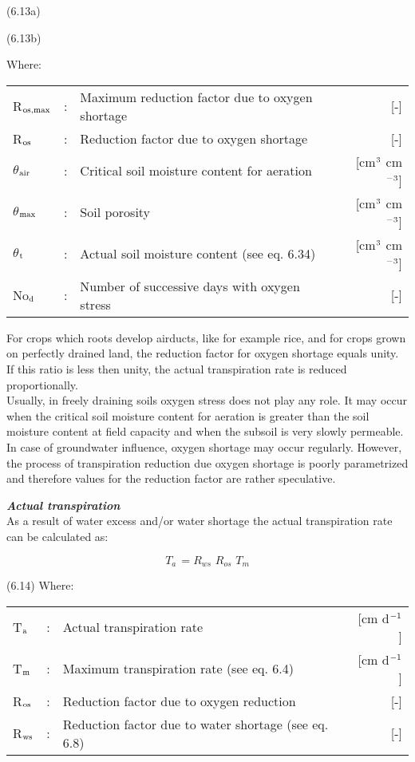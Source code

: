  
\strut\hfill (6.13a)


\strut\hfill (6.13b)


Where:\\
\begin{tabularx}{\textwidth}{llXr}



 R$_{{\rm os,max}}$ &:& Maximum reduction factor due to oxygen shortage & [-]\\
 R$_{{\rm os}}$ &:& Reduction factor due to oxygen shortage & [-]\\
 $\theta$$_{{\rm air}}$ &:& Critical soil moisture content for aeration & [cm$^{{\rm 3}}$ cm$^{{\rm -3}}$]\\
 $\theta$$_{{\rm max}}$ &:& Soil porosity & [cm$^{{\rm 3}}$ cm$^{{\rm -3}}$]\\
 $\theta$$_{{\rm t}}$ &:& Actual soil moisture content (see eq. 6.34) & [cm$^{{\rm 3}}$ cm$^{{\rm -3}}$]\\
 No$_{{\rm d}}$ &:& Number of successive days with oxygen stress & [-]
\end{tabularx}



For crops which roots develop airducts, like for example rice, and for crops grown on
perfectly drained land, the reduction factor for oxygen shortage equals unity. If this ratio
is less then unity, the actual transpiration rate is reduced proportionally. \\
Usually, in freely draining soils oxygen stress does not play any role. It may occur when
the critical soil moisture content for aeration is greater than the soil moisture content at
field capacity and when the subsoil is very slowly permeable. In case of groundwater
influence, oxygen shortage may occur regularly. However, the process of transpiration
reduction due oxygen shortage is poorly parametrized and therefore values for the
reduction factor are rather speculative. 



{\bf {\it Actual transpiration\/}}\\
As a result of water excess and/or water shortage the actual transpiration rate can be
calculated as:

\begin{equation}
T _{a~} =  R _{ws} \,\, R _{os} \,\, T _{m} 
\end{equation}

 
\strut\hfill (6.14)
Where:\\
\begin{tabularx}{\textwidth}{llXr}



 T$_{{\rm a}}$ &:& Actual transpiration rate & [cm d$^{{\rm -1}}$]\\
 T$_{{\rm m}}$ &:& Maximum transpiration rate (see eq. 6.4) & [cm d$^{{\rm -1}}$]\\
 R$_{{\rm os}}$ &:& Reduction factor due to oxygen reduction & [-]\\
 R$_{{\rm ws}}$ &:& Reduction factor due to water shortage (see eq. 6.8) & [-]
\end{tabularx}
 
